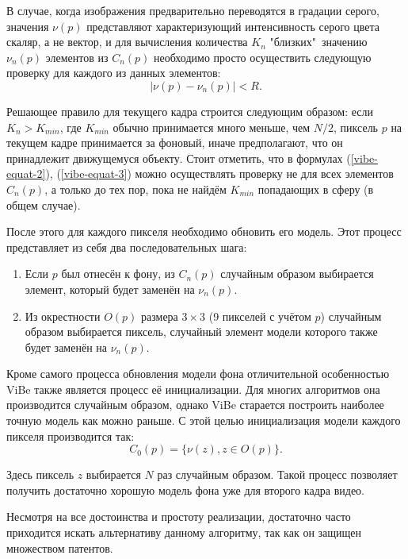 
В случае, когда изображения предварительно переводятся в градации серого,
значения $\nu(p)$ представляют характеризующий интенсивность серого цвета 
скаляр, а не вектор, и для вычисления количества $K_n$ "близких"\ 
значению $\nu_n(p)$ элементов из $C_n(p)$ необходимо просто осуществить
следующую проверку для каждого из данных элементов:
\begin{equation}
	|\nu(p) - \nu_n(p)| < R.
	\label{vibe-equat-3}
\end{equation}

Решающее правило для текущего кадра строится следующим образом:
если $K_n > K_{min}$, где $K_{min}$ обычно принимается много меньше, чем $N/2$,
пиксель $p$ на текущем кадре принимается за фоновый, иначе предполагают, что он
принадлежит движущемуся объекту. Стоит отметить, что в формулах 
(\ref{vibe-equat-2}), (\ref{vibe-equat-3}) можно осуществлять проверку не для
всех элементов $C_n(p)$, а только до тех пор, пока не найдём $K_{min}$ 
попадающих в сферу (в общем случае).

После этого для каждого пикселя необходимо обновить его модель. Этот процесс
представляет из себя два последовательных шага:
\begin{enumerate}
	\item Если $p$ был отнесён к фону, из $C_n(p)$ случайным образом
выбирается элемент, который будет заменён на $\nu_n(p)$.
 	\item Из окрестности $O(p)$ размера $3\times 3$ (9 пикселей с учётом $p$)
случайным образом выбирается пиксель, случайный элемент модели которого также
будет заменён на $\nu_n(p)$.
\end{enumerate}

Кроме самого процесса обновления модели фона отличительной особенностью ViBe 
также является процесс её инициализации. Для многих алгоритмов она
производится случайным образом, однако ViBe старается построить наиболее
точную модель как можно раньше. С этой целью инициализация модели каждого
пикселя производится так:
\begin{equation}
	C_0(p) = \{ \nu(z), z \in O(p)\}.
	\label{vibe-equat-4}
\end{equation}

Здесь пиксель $z$ выбирается $N$ раз случайным образом. Такой процесс позволяет
получить достаточно хорошую модель фона уже для второго кадра видео.

Несмотря на все достоинства и простоту реализации, достаточно часто приходится
искать альтернативу данному алгоритму, так как он защищен множеством патентов.


